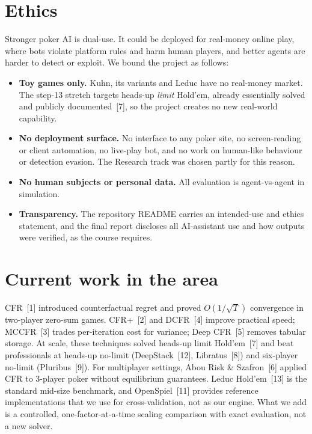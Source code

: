 \documentclass[10pt,a4paper]{article}
\begin{document}
\section{Ethics}
Stronger poker AI is dual-use. It could be deployed for real-money online play, where bots violate platform rules and harm human players, and better agents are harder to detect or exploit. We bound the project as follows:
\begin{itemize}
  \item \textbf{Toy games only.} Kuhn, its variants and Leduc have no real-money market. The step-13 stretch targets heads-up \emph{limit} Hold'em, already essentially solved and publicly documented~[7], so the project creates no new real-world capability.
  \item \textbf{No deployment surface.} No interface to any poker site, no screen-reading or client automation, no live-play bot, and no work on human-like behaviour or detection evasion. The Research track was chosen partly for this reason.
  \item \textbf{No human subjects or personal data.} All evaluation is agent-vs-agent in simulation.
  \item \textbf{Transparency.} The repository README carries an intended-use and ethics statement, and the final report discloses all AI-assistant use and how outputs were verified, as the course requires.
\end{itemize}

\section{Current work in the area}
CFR~[1] introduced counterfactual regret and proved $O(1/\sqrt{T})$ convergence in two-player zero-sum games. CFR+~[2] and DCFR~[4] improve practical speed; MCCFR~[3] trades per-iteration cost for variance; Deep CFR~[5] removes tabular storage. At scale, these techniques solved heads-up limit Hold'em~[7] and beat professionals at heads-up no-limit (DeepStack~[12], Libratus~[8]) and six-player no-limit (Pluribus~[9]). For multiplayer settings, Abou Risk \& Szafron~[6] applied CFR to 3-player poker without equilibrium guarantees. Leduc Hold'em~[13] is the standard mid-size benchmark, and OpenSpiel~[11] provides reference implementations that we use for cross-validation, not as our engine. What we add is a controlled, one-factor-at-a-time scaling comparison with exact evaluation, not a new solver.
\end{document}
